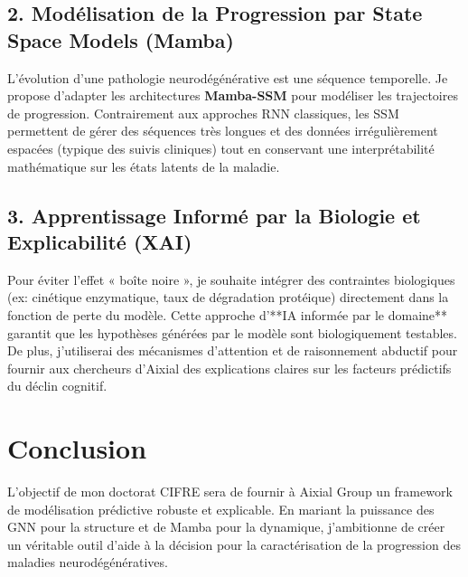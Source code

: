 \documentclass[11pt,a4paper]{article}
\begin{document}
\subsection{2. Modélisation de la Progression par State Space Models (Mamba)}
L'évolution d'une pathologie neurodégénérative est une séquence temporelle. Je propose d'adapter les architectures \textbf{Mamba-SSM} pour modéliser les trajectoires de progression. Contrairement aux approches RNN classiques, les SSM permettent de gérer des séquences très longues et des données irrégulièrement espacées (typique des suivis cliniques) tout en conservant une interprétabilité mathématique sur les états latents de la maladie.

\subsection{3. Apprentissage Informé par la Biologie et Explicabilité (XAI)}
Pour éviter l'effet « boîte noire », je souhaite intégrer des contraintes biologiques (ex: cinétique enzymatique, taux de dégradation protéique) directement dans la fonction de perte du modèle. Cette approche d'**IA informée par le domaine** garantit que les hypothèses générées par le modèle sont biologiquement testables. De plus, j'utiliserai des mécanismes d'attention et de raisonnement abductif pour fournir aux chercheurs d'Aixial des explications claires sur les facteurs prédictifs du déclin cognitif.

\section{Conclusion}
L'objectif de mon doctorat CIFRE sera de fournir à Aixial Group un framework de modélisation prédictive robuste et explicable. En mariant la puissance des GNN pour la structure et de Mamba pour la dynamique, j'ambitionne de créer un véritable outil d'aide à la décision pour la caractérisation de la progression des maladies neurodégénératives.
\end{document}
